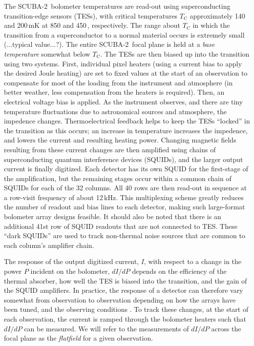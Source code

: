 \documentclass[useAMS,usenatbib,nofootinbib]{mn2e}
\newcommand{\scuba}{SCUBA-2}
\begin{document}
The \scuba\ bolometer temperatures are read-out using superconducting
transition-edge sensors (TESs), with critical temperatures
$T_\mathrm{C}$ approximately 140 and 200\,mK at 850 and 450\,\micron,
respectively. The range about $T_\mathrm{C}$ in which the transition
from a superconductor to a normal material occurs is extremely small
(...typical value...?). The entire \scuba\ focal plane is held at a
\emph{base temperature} somewhat below $T_\mathrm{C}$. The TESs are
then biased up into the transition using two systems. First,
individual pixel heaters (using a current bias to apply the desired
Joule heating) are set to fixed values at the start of an observation
to compensate for most of the loading from the instrument and
atmosphere (in better weather, less compensation from the heaters is
required). Then, an electrical voltage bias is applied. As the
instrument observes, and there are tiny temperature fluctuations due
to astronomical sources and atmosphere, the impedence
changes. Thermoelectrical feedback helps to keep the TESs ``locked''
in the transition as this occurs; an increase in temperature increases
the impedence, and lowers the current and resulting heating
power. Changing magnetic fields resulting from these current changes
are then amplified using chains of superconducting quantum
interference devices (SQUIDs), and the larger output current is
finally digitized. Each detector has its own SQUID for the first-stage
of the amplification, but the remaining stages occur within a common
chain of SQUIDs for each of the 32 columns. All 40 rows are then
read-out in sequence at a row-visit frequency of about 12\,kHz. This
multiplexing scheme greatly reduces the number of readout and bias
lines to each detector, making such large-format bolometer array
designs feasible. It should also be noted that there is an additional
41st row of SQUID readouts that are not connected to TES. These ``dark
SQUIDs'' are used to track non-thermal noise sources that are common
to each column's amplifier chain.

The response of the output digitized current, $I$, with respect to a
change in the power $P$ incident on the bolometer, $dI/dP$ depends on
the efficiency of the thermal absorber, how well the TES is biased
into the transition, and the gain of the SQUID amplifiers. In
practice, the response of a detector can therefore vary somewhat from
observation to observation depending on how the arrays have been
tuned, and the observing conditions \citep[see][]{holland2012}. To
track these changes, at the start of each observation, the current is
ramped through the bolometer heaters such that $dI/dP$ can be
measured. We will refer to the measurements of $dI/dP$ across the
focal plane as the \emph{flatfield} for a given observation.
\end{document}
